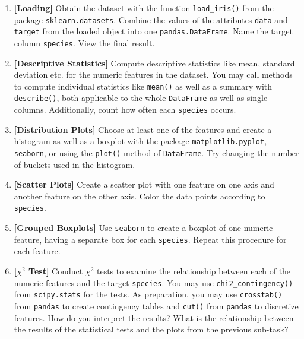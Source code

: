 \documentclass[12pt]{article}
\newcommand{\code}[1]{\textcolor{kitgreen}{\texttt{#1}}}
\newcommand{\taskname}[1]{\textcolor{kitblue}{\textbf{[#1]}}}
\begin{document}
\begin{enumerate}[label=\alph*), left=0pt, itemsep=12pt]
	\item
	\taskname{Loading}
	Obtain the dataset with the function \code{load\_iris()} from the package \code{sklearn.datasets}.
	Combine the values of the attributes \code{data} and \code{target} from the loaded object into one \code{pandas.DataFrame}.
	Name the target column \code{species}.
	View the final result.
	\item
	\taskname{Descriptive Statistics}
	Compute descriptive statistics like mean, standard deviation etc. for the numeric features in the dataset.
	You may call methods to compute individual statistics like \code{mean()} as well as a summary with \code{describe()}, both applicable to the whole \code{DataFrame} as well as single columns.
	Additionally, count how often each \code{species} occurs.
	\item
	\taskname{Distribution Plots}
	Choose at least one of the features and create a histogram as well as a boxplot with the package \code{matplotlib.pyplot}, \code{seaborn}, or using the \code{plot()} method of \code{DataFrame}.
	Try changing the number of buckets used in the histogram.
	\item
	\taskname{Scatter Plots}
	Create a scatter plot with one feature on one axis and another feature on the other axis.
	Color the data points according to \code{species}.
	\item
	\taskname{Grouped Boxplots}
	Use \code{seaborn} to create a boxplot of one numeric feature, having a separate box for each \code{species}.
	Repeat this procedure for each feature.
	\item
	\taskname{$\chi^2$ Test}
	Conduct $\chi^2$ tests to examine the relationship between each of the numeric features and the target \code{species}.
	You may use \code{chi2\_contingency()} from \code{scipy.stats} for the tests.
	As preparation, you may use \code{crosstab()} from \code{pandas} to create contingency tables and \code{cut()} from \code{pandas} to discretize features.
	\newline
	How do you interpret the results?
	What is the relationship between the results of the statistical tests and the plots from the previous sub-task?
\end{enumerate}
\end{document}
